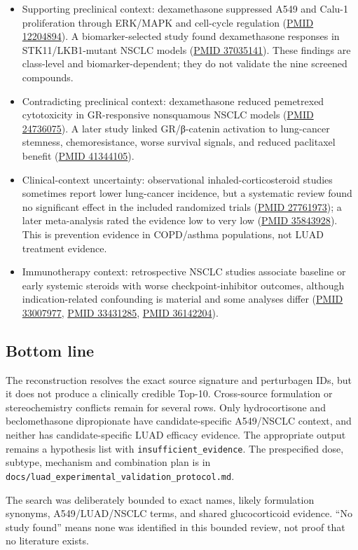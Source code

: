 \documentclass[
  10pt,
]{ctexart}
\providecommand{\tightlist}{%
  \setlength{\itemsep}{0pt}\setlength{\parskip}{0pt}}
\begin{document}
\begin{itemize}
\tightlist
\item
  Supporting preclinical context: dexamethasone suppressed A549 and
  Calu-1 proliferation through ERK/MAPK and cell-cycle regulation
  (\href{https://pubmed.ncbi.nlm.nih.gov/12204894/}{PMID 12204894}). A
  biomarker-selected study found dexamethasone responses in
  STK11/LKB1-mutant NSCLC models
  (\href{https://pubmed.ncbi.nlm.nih.gov/37035141/}{PMID 37035141}).
  These findings are class-level and biomarker-dependent; they do not
  validate the nine screened compounds.
\item
  Contradicting preclinical context: dexamethasone reduced pemetrexed
  cytotoxicity in GR-responsive nonsquamous NSCLC models
  (\href{https://pubmed.ncbi.nlm.nih.gov/24736075/}{PMID 24736075}). A
  later study linked GR/β-catenin activation to lung-cancer stemness,
  chemoresistance, worse survival signals, and reduced paclitaxel
  benefit (\href{https://pubmed.ncbi.nlm.nih.gov/41344105/}{PMID
  41344105}).
\item
  Clinical-context uncertainty: observational inhaled-corticosteroid
  studies sometimes report lower lung-cancer incidence, but a systematic
  review found no significant effect in the included randomized trials
  (\href{https://pubmed.ncbi.nlm.nih.gov/27761973/}{PMID 27761973}); a
  later meta-analysis rated the evidence low to very low
  (\href{https://pubmed.ncbi.nlm.nih.gov/35843928/}{PMID 35843928}).
  This is prevention evidence in COPD/asthma populations, not LUAD
  treatment evidence.
\item
  Immunotherapy context: retrospective NSCLC studies associate baseline
  or early systemic steroids with worse checkpoint-inhibitor outcomes,
  although indication-related confounding is material and some analyses
  differ (\href{https://pubmed.ncbi.nlm.nih.gov/33007977/}{PMID
  33007977}, \href{https://pubmed.ncbi.nlm.nih.gov/33431285/}{PMID
  33431285}, \href{https://pubmed.ncbi.nlm.nih.gov/36142204/}{PMID
  36142204}).
\end{itemize}

\subsection{Bottom line}\label{bottom-line}

The reconstruction resolves the exact source signature and perturbagen
IDs, but it does not produce a clinically credible Top-10. Cross-source
formulation or stereochemistry conflicts remain for several rows. Only
hydrocortisone and beclomethasone dipropionate have candidate-specific
A549/NSCLC context, and neither has candidate-specific LUAD efficacy
evidence. The appropriate output remains a hypothesis list with
\texttt{insufficient\_\allowbreak{}evidence}. The prespecified dose, subtype,
mechanism and combination plan is in
\texttt{docs/\allowbreak{}luad\_\allowbreak{}experimental\_\allowbreak{}validation\_\allowbreak{}protocol.\allowbreak{}md}.

The search was deliberately bounded to exact names, likely formulation
synonyms, A549/LUAD/NSCLC terms, and shared glucocorticoid evidence.
``No study found'' means none was identified in this bounded review, not
proof that no literature exists.
\end{document}
